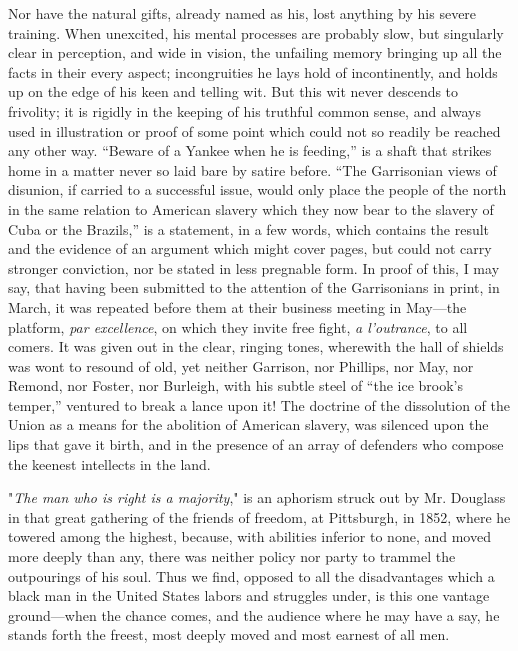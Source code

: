 Nor have the natural gifts, already named as his, lost anything by his
severe training. When unexcited, his mental processes are probably slow,
but singularly clear in perception, and wide in vision, the unfailing
memory bringing up all the facts in their every aspect; incongruities he
lays hold of incontinently, and holds up on the edge of his keen and
telling wit. But this wit never descends to frivolity; it is rigidly in
the keeping of his truthful common sense, and always used in
illustration or proof of some point which could not so readily be
reached any other way. ``Beware of a Yankee when he is feeding,'' is a
shaft that strikes home in a matter never so laid bare by satire before.
``The Garrisonian views of disunion, if carried to a successful issue,
would only place the people of the north in the same relation to
American slavery which they now bear to the slavery of Cuba or the
Brazils,'' is a statement, in a few words, which contains the result and
the evidence of an argument which might cover pages, but could not carry
stronger conviction, nor be stated in less pregnable form. In proof of
this, I may say, that having been submitted to the attention of the
Garrisonians in print, in March, it was repeated before them at their
business meeting in May---the platform, \emph{par excellence}, on which
they invite free fight, \emph{a l'outrance}, to all comers. It was given
out in the clear, ringing tones, wherewith the hall of shields was wont
to resound of old, yet neither Garrison, nor Phillips, nor May, nor
Remond, nor Foster, nor Burleigh, with his subtle steel of ``the ice
brook's temper,'' ventured to break a lance upon it! The doctrine of the
dissolution of the Union as a means for the abolition of American
slavery, was silenced upon the lips that gave it birth, and in the
presence {}of an array of defenders who compose the keenest intellects
in the land.

"\emph{The man who is right is a majority}," is an aphorism struck out
by Mr. Douglass in that great gathering of the friends of freedom, at
Pittsburgh, in 1852, where he towered among the highest, because, with
abilities inferior to none, and moved more deeply than any, there was
neither policy nor party to trammel the outpourings of his soul. Thus we
find, opposed to all the disadvantages which a black man in the United
States labors and struggles under, is this one vantage ground---when the
chance comes, and the audience where he may have a say, he stands forth
the freest, most deeply moved and most earnest of all men.

